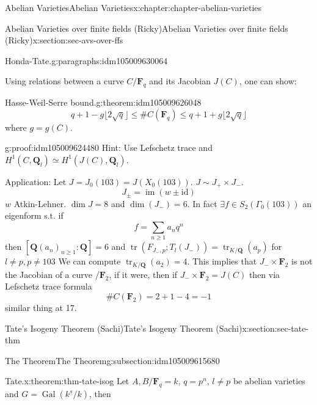 \documentclass[oneside,10pt,]{book}
\numberwithin{equation}{section}
\newcommand{\lb}{[}
\newcommand{\rb}{]}
\newcommand{\QQ}{\mathbf{Q}}
\newcommand{\FF}{\mathbf{F}}
\newcommand{\id}{\mathrm{id}}
\DeclareMathOperator{\im}{im}
\DeclareMathOperator{\tr}{tr}
\newcommand{\Gal}[2]{\operatorname{Gal}(#1/#2)}
\begin{document}
\begin{chapterptx}{Abelian Varieties}{}{Abelian Varieties}{}{}{x:chapter:chapter-abelian-varieties}
\begin{sectionptx}{Abelian Varieties over finite fields (Ricky)}{}{Abelian Varieties over finite fields (Ricky)}{}{}{x:section:sec-avs-over-ffs}
\begin{paragraphs}{Honda-Tate.}{g:paragraphs:idm105009630064}
\end{paragraphs}%
\par
Using relations between a curve \(C/\FF_q\) and its Jacobian \(J(C) \), one can show:%
\begin{theorem}{Hasse-Weil-Serre bound.}{}{g:theorem:idm105009626048}%
%
\begin{equation*}
q + 1 - g\lfloor 2\sqrt q\rfloor \le \#C(\FF_{q}) \le q + 1 + g\lfloor 2\sqrt q\rfloor
\end{equation*}
where \(g=  g(C)\).%
\end{theorem}
\begin{proofptx}{}{g:proof:idm105009624480}
Hint: Use Lefschetz trace and \(H^1(C, \QQ_l) \simeq H^1(J(C) , \QQ_l)\).%
\end{proofptx}
Application: Let \(J = J_0(103) = J(X_0(103))\). \(J\sim J_+ \times J_-\).%
\begin{equation*}
J_{\pm} = \im(w \pm \id)
\end{equation*}
\(w\) Atkin-Lehner. \(\dim J = 8\) and \(\dim(J_-) = 6\). In fact \(\exists f\in  S_2( \Gamma_0(103))\) an eigenform s.t. if%
\begin{equation*}
f=\sum_{n\ge 1} a_n q^n
\end{equation*}
then \(\lb \QQ(a_n)_{n \ge 1}: \QQ\rb =6\) and \(\tr( F_{J_-,p};  T_l(J_-)) = \tr_{K/\QQ}(a_p)\)  for \(l \ne p, p\ne 103\) We can compute \(\tr_{K/\QQ} ( a_2) = 4\). This implies that \(J_- \times \FF_2\) is not the Jacobian of a curve \(/\FF_2\), if it were, then  if \(J_- \times \FF_2 = J(C)\) then via Lefschetz trace formula%
\begin{equation*}
\#C(\FF_2) = 2+1 - 4 = -1
\end{equation*}
similar thing at 17.%
\end{sectionptx}
%
%
\typeout{************************************************}
\typeout{************************************************}
%
\begin{sectionptx}{Tate's Isogeny Theorem (Sachi)}{}{Tate's Isogeny Theorem (Sachi)}{}{}{x:section:sec-tate-thm}
%
%
\typeout{************************************************}
\typeout{************************************************}
%
\begin{subsectionptx}{The Theorem}{}{The Theorem}{}{}{g:subsection:idm105009615680}
\begin{theorem}{Tate.}{}{x:theorem:thm-tate-isog}%
Let \(A,B/\FF_q = k\), \(q = p^n\), \(l\ne p\) be abelian varieties and \(G = \Gal{k^s}{k}\), then%

\end{theorem}
\end{subsectionptx}
\end{sectionptx}
\end{chapterptx}
\end{document}
